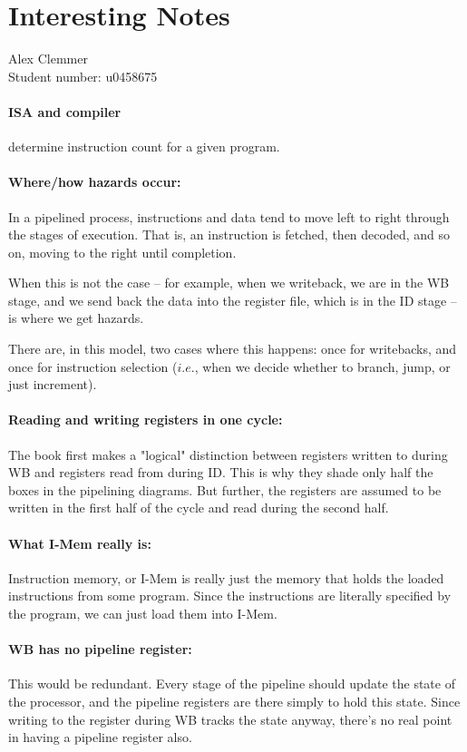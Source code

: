 \documentclass[a4paper]{article}
\begin{document}
\section*{Interesting Notes}
Alex Clemmer\\
Student number: u0458675

\paragraph{ISA and compiler} determine instruction count for a given program.

\paragraph{Where/how hazards occur:} In a pipelined process, instructions and data tend to move left to right through the stages of execution. That is, an instruction is fetched, then decoded, and so on, moving to the right until completion.

When this is not the case -- for example, when we writeback, we are in the WB stage, and we send back the data into the register file, which is in the ID stage -- is where we get hazards.

There are, in this model, two cases where this happens: once for writebacks, and once for instruction selection ($\textit{i.e.}$, when we decide whether to branch, jump, or just increment).

\paragraph{Reading and writing registers in one cycle:} The book first makes a "logical" distinction between registers written to during WB and registers read from during ID. This is why they shade only half the boxes in the pipelining diagrams. But further, the registers are assumed to be written in the first half of the cycle and read during the second half.

\paragraph{What I-Mem really is:} Instruction memory, or I-Mem is really just the memory that holds the loaded instructions from some program. Since the instructions are literally specified by the program, we can just load them into I-Mem.

\paragraph{WB has no pipeline register: } This would be redundant. Every stage of the pipeline should update the state of the processor, and the pipeline registers are there simply to hold this state. Since writing to the register during WB tracks the state anyway, there's no real point in having a pipeline register also.
\end{document}
